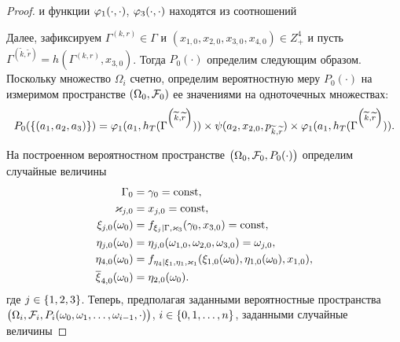 \documentclass[a4paper,12pt,russian]{extarticle}
\newcommand{\G}{\Gamma}
\newcommand{\ga}[1]{\Gamma^{\left( #1 \right)} }
\begin{document}
\begin{proof}
 и функции $\varphi_1(\cdot,\cdot)$, $\varphi_3(\cdot,\cdot)$ находятся из соотношений

Далее, зафиксируем $\ga{k,r}\in \G$ и $(x_{1,0},x_{2,0},x_{3,0},x_{4,0})\in Z_+^4$ и пусть $\ga{\widetilde{k},\widetilde{r}}=h(\ga{k,r},x_{3,0})$. Тогда  $P_0(\cdot)$ определим следующим образом.
Поскольку множество $\Omega_i$ счетно, определим вероятностную меру $P_0(\cdot)$ на измеримом пространстве $(\Omega_0,{\cal F}_0)$ ее значениями на одноточечных множествах:
\begin{equation}
P_0(\{(a_1,a_2,a_3)\})=\vp_1(a_1,h_T(\ga{\widetilde{k},\widetilde{r}})) \times \psi(a_2,x_{2,0}, p_{\widetilde{k},\widetilde{r}}) \times \vp_1(a_1,h_T(\ga{\widetilde{k},\widetilde{r}})).
\label{probabilitiesOne}
\end{equation}

На построенном вероятностном пространстве $\left(\Omega_0,{\cal F}_0,P_0(\cdot)\right)$ определим случайные величины
\begin{equation}
\begin{aligned}
\G_0&=\gamma_0=\mathrm{const},\\
\vk_{j,0}&=x_{j,0}=\mathrm{const},\\
\xi_{j,0}(\omega_0)&=f_{\xi_j | \G,\vk_3} (\gamma_0,x_{3,0})=\mathrm{const},\\
\eta_{j,0}(\omega_0)&=\eta_{j,0}(\omega_{1,0},\omega_{2,0},\omega_{3,0})=\omega_{j,0}, \\
\eta_{4,0}(\omega_0)&=f_{\eta_4| \xi_1, \eta_1, \vk_1} (\xi_{1,0}(\omega_0),\eta_{1,0}(\omega_0),x_{1,0}),\\
\overline{\xi}_{4,0}(\omega_0)&=\eta_{2,0}(\omega_0).
\end{aligned}
\label{functionsOne}
\end{equation}
где $j\in \left\{1,2,3\right\}$.
Теперь, предполагая заданными вероятностные пространства \linebreak$\left(\Omega_i, {\cal F}_i,P_i(\omega_0, \omega_1, \ldots, \omega_{i-1},\cdot)\right)$, $i\in \left\{0,1,\ldots,n\right\}$, заданными случайные величины 


\end{proof}
\end{document}
